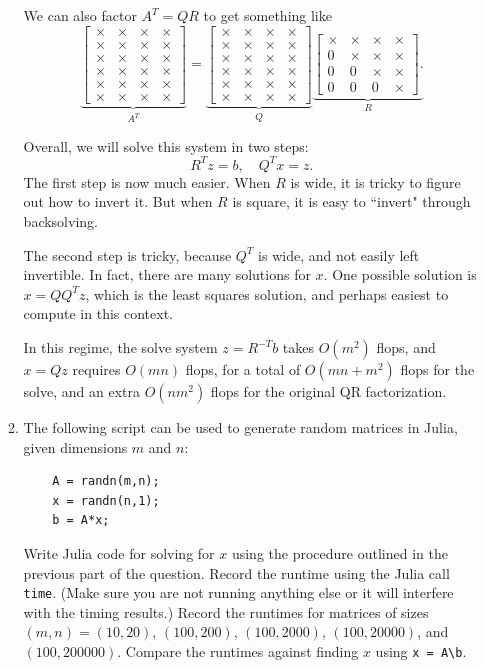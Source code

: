 \documentclass{article}
\newcommand{\bmat}{\left[\begin{matrix}}
\newcommand{\emat}{\end{matrix}\right]}
\begin{document}
\begin{enumerate}
\begin{enumerate}
{We can also factor $A^T=QR$ to get something like
\[
\underbrace{\bmat 
	\times  & \times & \times & \times  \\
	\times  & \times & \times & \times \\
	\times  & \times & \times & \times \\
	\times  & \times & \times & \times \\
	\times  & \times & \times & \times \\
	\times  & \times & \times & \times 	
	\emat 
}_{A^T}
=
\underbrace{\bmat 
	\times  & \times & \times & \times  \\
	\times  & \times & \times & \times \\
	\times  & \times & \times & \times \\
	\times  & \times & \times & \times \\
	\times  & \times & \times & \times \\
	\times  & \times & \times & \times 	
	\emat }_{Q}
\underbrace{\bmat 
	\times  & \times & \times & \times  \\
	0  & \times & \times & \times \\
	0  & 0 & \times & \times \\
	0  & 0 & 0 & \times 
	\emat. }_{R}
\]

Overall, we will solve this system in two steps:
\[
 R^Tz = b, \quad Q^Tx = z.
\]
The first step is now much easier. 
When $R$ is wide, it is tricky to figure out how to invert it. But when $R$ is square, it is easy to ``invert" through backsolving. 

The second step is tricky, because $Q^T$ is wide, and not easily left invertible. In fact, there are many solutions for $x$. One possible solution is 
$x = QQ^Tz$, which is the least squares solution, and perhaps easiest to compute in this context. 

In this regime, the solve system $z = R^{-T}b$ takes $O(m^2)$ flops, and $x = Qz$ requires $O(mn)$ flops, for a total of $O(mn+m^2)$ flops for the solve, and an extra $O(nm^2)$ flops for the original QR factorization.
}
	\item The following script can be used to generate random matrices in Julia, given dimensions $m$ and $n$:
	
	\begin{verbatim}
	A = randn(m,n);
	x = randn(n,1);
	b = A*x;
	\end{verbatim}
	
	Write Julia code for solving for $x$ using the procedure outlined in the previous part of the question. Record the runtime
	 using the Julia call \texttt{time}. (Make sure you are not running anything else or it will interfere with the timing 
	 results.) Record the runtimes for matrices of sizes  $(m,n) = (10,20)$, $(100,200)$, $(100,2000)$,  $(100,20000)$, and 
	 $(100,200000)$. Compare the runtimes against finding $x$ using \verb|x = A\b|.
	

\end{enumerate}
\end{enumerate}
\end{document}
